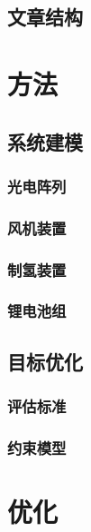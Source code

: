 \documentclass{HEBUTMaster}   %
\begin{document}
\section{文章结构}


\chapter{方法}
\section{系统建模}

\subsection{光电阵列}

\subsection{风机装置}

\subsection{制氢装置}

\subsection{锂电池组}

\section{目标优化}

\subsection{评估标准}

\subsection{约束模型}


\chapter{优化}
\end{document}
